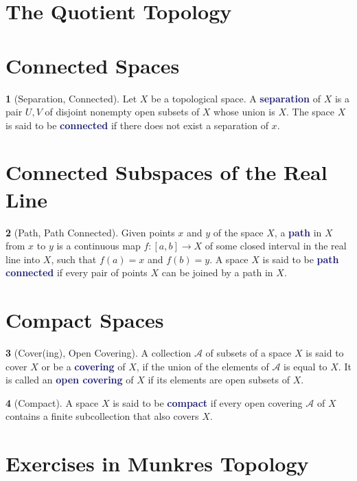 \documentclass[12pt]{article}
\newcommand{\navy}[1]{\textcolor{MidnightBlue}{\bf #1}}
\theoremstyle{plain}
\theoremstyle{definition}
\newtheorem{definition}{\color{MidnightBlue}{\textbf{Definition}}}[section]
\newcommand{\1}{\mathbbm 1}
\newcommand{\aA}{\mathscr A}
\begin{document}
\section{The Quotient Topology}

\section{Connected Spaces}

\begin{definition}[Separation, Connected]
	Let $X$ be a topological space. A \navy{separation} of $X$ is a pair $U,V$ of disjoint nonempty open subsets of $X$ whose union is $X$. The space $X$ is said to be \navy{connected} if there does not exist a separation of $x.$ 
\end{definition}

\section{Connected Subspaces of the Real Line}

\begin{definition}[Path, Path Connected]
	Given points $x$ and $y$ of the space $X$, a \navy{path} in $X$ from $x$ to $y$ is a continuous map $f:[a,b] \to X$ of some closed interval in the real line into $X$, such that $f(a) = x$ and $f(b) = y$. A space $X$ is said to be \navy{path connected} if every pair of points $X$ can be joined by a path in $X$.
\end{definition}

\section{Compact Spaces}

\begin{definition}[Cover(ing), Open Covering]
	A collection $\aA$ of subsets of a space $X$ is said to cover $X$ or be a \navy{covering} of $X$, if the union of the elements of $\aA$ is equal to $X$. It is called an \navy{open covering} of $X$ if its elements are open subsets of $X$.
\end{definition}

\begin{definition}[Compact]
	A space $X$ is said to be \navy{compact} if every open covering $\aA$ of $X$ contains a finite subcollection that also covers $X$.
\end{definition}



\section{Exercises in Munkres Topology}
\end{document}
